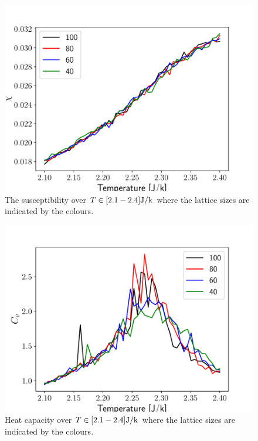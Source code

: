 \documentclass[english,notitlepage,reprint,nofootinbib]{revtex4-2}  %
\begin{document}
	\begin{figure}[h!]
	  \centering
	  \includegraphics[width=1.0\linewidth]{figures/prob8_chi.pdf}
	  \caption{The susceptibility over $T\in [2.1-2.4] \rm{ J}/k$ where the lattice sizes are indicated by the colours.\label{fig:prob8_chi} }
	\end{figure}

	\begin{figure}[h!]
	  \centering
	  \includegraphics[width=1.0\linewidth]{figures/prob8_cv.pdf}
	  \caption{Heat capacity over $T\in [2.1-2.4] \rm{ J}/k$ where the lattice sizes are indicated by the colours.\label{fig:prob8_cv} }
	\end{figure}
\end{document}
